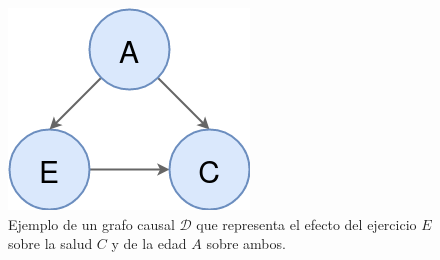 \begin{figure}
    \centering
    \includegraphics[scale=0.35]{Chapter2/Figs/example-dag.png}
    \caption{Ejemplo de un grafo causal $\mathcal{D}$ que representa el efecto del ejercicio $E$ sobre la salud $C$ y de la edad $A$ sobre ambos.}
    \label{fig:dag-causal}
\end{figure}
    





